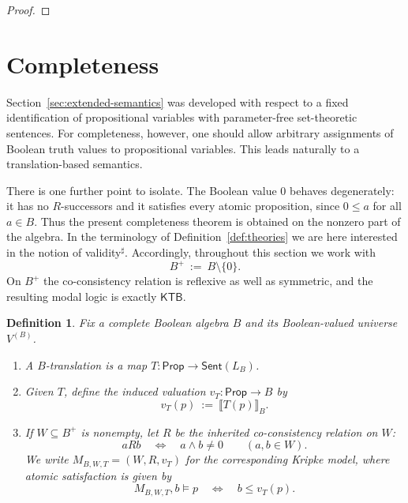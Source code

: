 \documentclass[10pt,a4paper]{amsart}
\newtheorem{definition}{Definition}[section]
\newcommand{\Prop}{\mathsf{Prop}}
\newcommand{\Sent}{\mathsf{Sent}}
\newcommand{\KTB}{\mathsf{KTB}}
\begin{document}
\begin{proof}
\end{proof}

\section{Completeness}\label{sec:completeness}

Section~\ref{sec:extended-semantics} was developed with respect to a fixed identification of propositional variables with parameter-free
set-theoretic sentences. For completeness, however, one should allow arbitrary assignments of
Boolean truth values to propositional variables. This leads naturally to a translation-based
semantics.

There is one further point to isolate. The Boolean value $0$ behaves degenerately: it has no
$R$-successors and it satisfies every atomic proposition, since $0\leq a$ for all $a\in B$. Thus the
present completeness theorem is obtained on the nonzero part of the algebra. In the terminology of Definition~\ref{def:theories} we are here interested in the notion of validity$^\sharp$. Accordingly, throughout
this section we work with
\[
B^+\ :=\ B\setminus\{0\}.
\]
On $B^+$ the co-consistency relation is reflexive as well as symmetric, and the resulting modal
logic is exactly $\KTB$.

\begin{definition}\label{def:B-translation-nonzero}
Fix a complete Boolean algebra $B$ and its Boolean-valued universe $V^{(B)}$.
\begin{enumerate}
    \item A \emph{$B$-translation} is a map $T:\Prop\to\Sent(L_B)$.
    \item Given $T$, define the induced valuation $v_T:\Prop\to B$ by
    \[
    v_T(p)\ :=\ \llbracket T(p)\rrbracket_B.
    \]
    \item If $W\subseteq B^+$ is nonempty, let $R$ be the inherited co-consistency relation on $W$:
    \[
    aRb \quad\Longleftrightarrow\quad a\wedge b\neq 0 \qquad (a,b\in W).
    \]
    We write $M_{B,W,T}=(W,R,v_T)$ for the corresponding Kripke model, where atomic satisfaction
    is given by
    \[
    M_{B,W,T},b\models p \quad\Longleftrightarrow\quad b\leq v_T(p).
    \]
\end{enumerate}
\end{definition}
\end{document}
